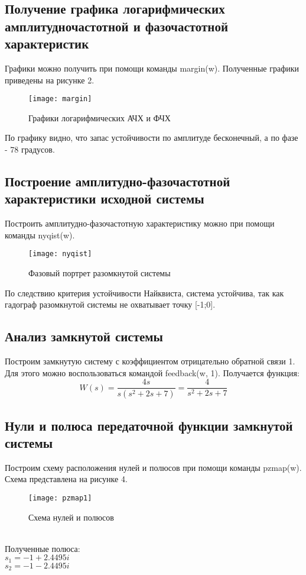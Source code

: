 \documentclass[a4paper, 12pt]{article}
\begin{document}
	\subsection{Получение графика логарифмических амплитудночастотной и фазочастотной характеристик}
	Графики можно получить при помощи команды margin(w). Полученные графики приведены на рисунке 2.
	\begin{figure}[h!]
		\begin{center}
			\texttt{[image: margin]}
			\caption{Графики логарифмических АЧХ и ФЧХ}
		\end{center}  
	\end{figure}\par
	По графику видно, что запас устойчивости по амплитуде бесконечный, а по фазе - 78 градусов. 
	\newpage
	\subsection{Построение амплитудно-фазочастотной характеристики исходной системы}
	Построить амплитудно-фазочастотную характеристику можно при помощи команды nyqist(w).
	\begin{figure}[h!]
		\begin{center}
			\texttt{[image: nyqist]}
			\caption{Фазовый портрет разомкнутой системы}
		\end{center}  
	\end{figure}\par
	По следствию критерия устойчивости Найквиста, система устойчива, так как гадограф разомкнутой системы не охватывает точку [-1;0].
	\newpage
	\begin{center}
	\section{Анализ замкнутой системы}
	\end{center}\par
	Построим замкнутую систему с коэффициентом отрицательно обратной связи 1. Для этого можно воспользоваться командой feedback(w, 1). Получается функция:
	\begin{equation}
	W(s)=\frac{4s}{s(s^2+2s+7)}=\frac{4}{s^2+2s+7}
	\end{equation}
	\subsection{Нули и полюса передаточной функции замкнутой системы} 
	Построим схему расположения нулей и полюсов при помощи команды pzmap(w). Схема представлена на рисунке 4.
	\begin{figure}[h!]
		\begin{center}
			\texttt{[image: pzmap1]}
			\caption{Схема нулей и полюсов}
		\end{center}  
	\end{figure}\\
	Полученные полюса:\\
	$s_1=-1 + 2.4495i$\\
	$s_2=-1 - 2.4495i$
	\newpage
\end{document}
